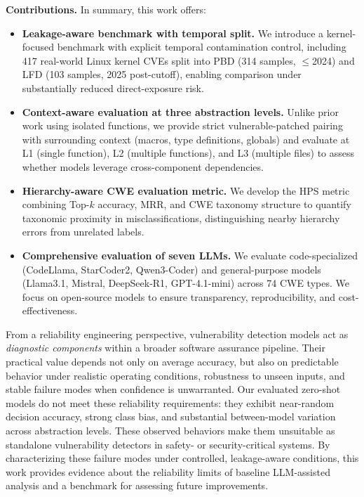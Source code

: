 \documentclass[lettersize,journal]{IEEEtran}
\begin{document}
\textbf{Contributions.} In summary, this work offers:
\begin{itemize}
    \item \textbf{Leakage-aware benchmark with temporal split.} We introduce a kernel-focused benchmark with explicit temporal contamination control, including 417 real-world Linux kernel CVEs split into PBD (314 samples, $\leq$2024) and LFD (103 samples, 2025 post-cutoff), enabling comparison under substantially reduced direct-exposure risk.

    \item \textbf{Context-aware evaluation at three abstraction levels.} Unlike prior work using isolated functions, we provide strict vulnerable-patched pairing with surrounding context (macros, type definitions, globals) and evaluate at L1 (single function), L2 (multiple functions), and L3 (multiple files) to assess whether models leverage cross-component dependencies.

    \item \textbf{Hierarchy-aware CWE evaluation metric.} We develop the \gls{HPS} metric combining Top-$k$ accuracy, \gls{MRR}, and CWE taxonomy structure to quantify taxonomic proximity in misclassifications, distinguishing nearby hierarchy errors from unrelated labels.

    \item \textbf{Comprehensive evaluation of seven LLMs.} We evaluate code-specialized (CodeLlama, StarCoder2, Qwen3-Coder) and general-purpose models (Llama3.1, Mistral, DeepSeek-R1, GPT-4.1-mini) across 74 CWE types. We focus on open-source models to ensure transparency, reproducibility, and cost-effectiveness.

\end{itemize}

From a reliability engineering perspective, vulnerability detection models act as \emph{diagnostic components} within a broader software assurance pipeline. Their practical value depends not only on average accuracy, but also on predictable behavior under realistic operating conditions, robustness to unseen inputs, and stable failure modes when confidence is unwarranted. Our evaluated zero-shot models do not meet these reliability requirements: they exhibit near-random decision accuracy, strong class bias, and substantial between-model variation across abstraction levels. These observed behaviors make them unsuitable as standalone vulnerability detectors in safety- or security-critical systems. By characterizing these failure modes under controlled, leakage-aware conditions, this work provides evidence about the reliability limits of baseline LLM-assisted analysis and a benchmark for assessing future improvements.
\end{document}
